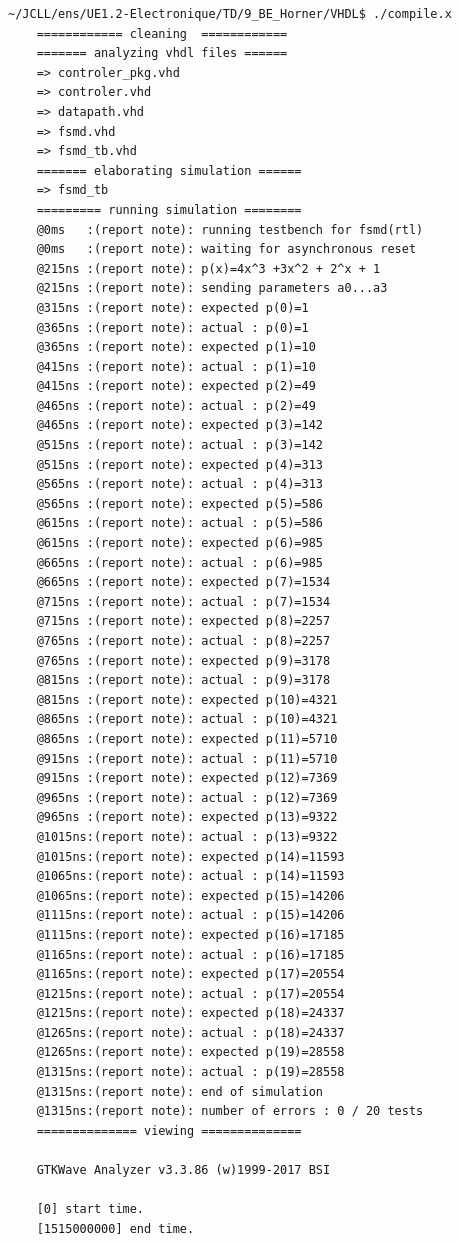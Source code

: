 \documentclass[a4paper,11pt]{exam}
\begin{document}
\begin{questions}
\begin{solution}
    \begin{Verbatim}[fontsize=\small]
    ~/JCLL/ens/UE1.2-Electronique/TD/9_BE_Horner/VHDL$ ./compile.x
    ============ cleaning  ============
    ======= analyzing vhdl files ======
    => controler_pkg.vhd
    => controler.vhd
    => datapath.vhd
    => fsmd.vhd
    => fsmd_tb.vhd
    ======= elaborating simulation ======
    => fsmd_tb
    ========= running simulation ========
    @0ms   :(report note): running testbench for fsmd(rtl)
    @0ms   :(report note): waiting for asynchronous reset
    @215ns :(report note): p(x)=4x^3 +3x^2 + 2^x + 1
    @215ns :(report note): sending parameters a0...a3
    @315ns :(report note): expected p(0)=1
    @365ns :(report note): actual : p(0)=1
    @365ns :(report note): expected p(1)=10
    @415ns :(report note): actual : p(1)=10
    @415ns :(report note): expected p(2)=49
    @465ns :(report note): actual : p(2)=49
    @465ns :(report note): expected p(3)=142
    @515ns :(report note): actual : p(3)=142
    @515ns :(report note): expected p(4)=313
    @565ns :(report note): actual : p(4)=313
    @565ns :(report note): expected p(5)=586
    @615ns :(report note): actual : p(5)=586
    @615ns :(report note): expected p(6)=985
    @665ns :(report note): actual : p(6)=985
    @665ns :(report note): expected p(7)=1534
    @715ns :(report note): actual : p(7)=1534
    @715ns :(report note): expected p(8)=2257
    @765ns :(report note): actual : p(8)=2257
    @765ns :(report note): expected p(9)=3178
    @815ns :(report note): actual : p(9)=3178
    @815ns :(report note): expected p(10)=4321
    @865ns :(report note): actual : p(10)=4321
    @865ns :(report note): expected p(11)=5710
    @915ns :(report note): actual : p(11)=5710
    @915ns :(report note): expected p(12)=7369
    @965ns :(report note): actual : p(12)=7369
    @965ns :(report note): expected p(13)=9322
    @1015ns:(report note): actual : p(13)=9322
    @1015ns:(report note): expected p(14)=11593
    @1065ns:(report note): actual : p(14)=11593
    @1065ns:(report note): expected p(15)=14206
    @1115ns:(report note): actual : p(15)=14206
    @1115ns:(report note): expected p(16)=17185
    @1165ns:(report note): actual : p(16)=17185
    @1165ns:(report note): expected p(17)=20554
    @1215ns:(report note): actual : p(17)=20554
    @1215ns:(report note): expected p(18)=24337
    @1265ns:(report note): actual : p(18)=24337
    @1265ns:(report note): expected p(19)=28558
    @1315ns:(report note): actual : p(19)=28558
    @1315ns:(report note): end of simulation
    @1315ns:(report note): number of errors : 0 / 20 tests
    ============== viewing ==============

    GTKWave Analyzer v3.3.86 (w)1999-2017 BSI

    [0] start time.
    [1515000000] end time.

  \end{Verbatim}
  \end{solution}
\end{questions}
\end{document}
